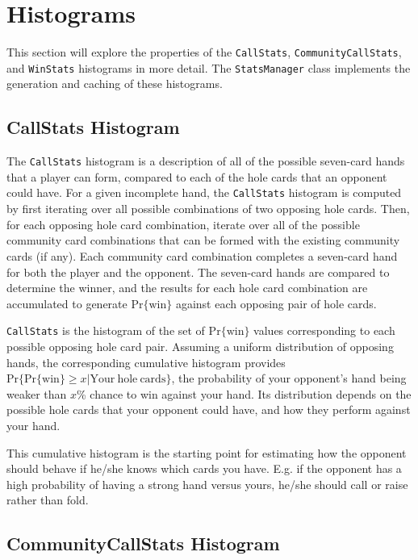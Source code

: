 \section{Histograms}
\label{sec:Histograms}

This section will explore the properties of the \texttt{CallStats}, \texttt{CommunityCallStats}, and \texttt{WinStats} histograms in more detail.
The \texttt{StatsManager} class implements the generation and caching of these histograms.

\subsection{CallStats Histogram}
\label{sec:CallStats}

The \texttt{CallStats} histogram is a description of all of the possible seven-card hands that a player can form, compared to each of the hole cards that an opponent could have.
For a given incomplete hand, the \texttt{CallStats} histogram is computed by first iterating over all possible combinations of two opposing hole cards.
Then, for each opposing hole card combination, iterate over all of the possible community card combinations that can be formed with the existing community cards (if any).
Each community card combination completes a seven-card hand for both the player and the opponent.
The seven-card hands are compared to determine the winner, and the results for each hole card combination are accumulated to generate $\mathrm{Pr\{win\}}$ against each opposing pair of hole cards.

\texttt{CallStats} is the histogram of the set of $\mathrm{Pr\{win\}}$ values corresponding to each possible opposing hole card pair.
Assuming a uniform distribution of opposing hands, the corresponding cumulative histogram provides $\mathrm{Pr}\{\mathrm{Pr\{win\}} \ge x|\mathrm{Your\:hole\:cards}\}$, the probability of your opponent's hand being weaker than $x$\% chance to win against your hand.
Its distribution depends on the possible hole cards that your opponent could have, and how they perform against your hand.

This cumulative histogram is the starting point for estimating how the opponent should behave if he/she knows which cards you have.
E.g. if the opponent has a high probability of having a strong hand versus yours, he/she should call or raise rather than fold.


\subsection{CommunityCallStats Histogram}
\label{sec:CommunityCallStats}

